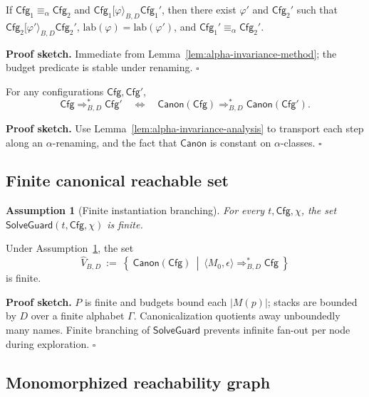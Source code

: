 \documentclass[runningheads]{llncs}
\newcommand{\Canon}{\mathsf{Canon}}
\newcommand{\Cfg}{\mathsf{Cfg}}
\newcommand{\SolveGuard}{\mathsf{SolveGuard}}
\newtheorem{assumption}{Assumption}
\begin{document}
\begin{lemma}
\label{lem:alpha-invariance-analysis}
If $\Cfg_1\equiv_\alpha \Cfg_2$ and $\Cfg_1[\varphi\rangle_{B,D}\Cfg_1'$,
then there exist $\varphi'$ and $\Cfg_2'$ such that
$\Cfg_2[\varphi'\rangle_{B,D}\Cfg_2'$, $\mathrm{lab}(\varphi)=\mathrm{lab}(\varphi')$,
and $\Cfg_1'\equiv_\alpha \Cfg_2'$.
\end{lemma}
\noindent\textbf{Proof sketch.}
Immediate from Lemma~\ref{lem:alpha-invariance-method}; the budget predicate is stable under renaming. \hfill $\square$

\begin{theorem}
\label{thm:quotient-soundness}
For any configurations $\Cfg,\Cfg'$,
\[
\Cfg \Rightarrow^{*}_{B,D} \Cfg'
\quad\Longleftrightarrow\quad
\Canon(\Cfg) \Rightarrow^{*}_{B,D} \Canon(\Cfg').
\]
\end{theorem}
\noindent\textbf{Proof sketch.}
Use Lemma~\ref{lem:alpha-invariance-analysis} to transport each step along an $\alpha$-renaming,
and the fact that $\Canon$ is constant on $\alpha$-classes. \hfill $\square$

\subsection{Finite canonical reachable set}
\label{sec:analysis:finiteness2}

\begin{assumption}[Finite instantiation branching]
\label{ass:finite-inst}
For every $t,\Cfg,\chi$, the set $\SolveGuard(t,\Cfg,\chi)$ is finite.
\end{assumption}

\begin{theorem}
\label{thm:finite-canon-reach}
Under Assumption~\ref{ass:finite-inst}, the set
\[
\widehat{V}_{B,D}
~:=~
\left\{\ \Canon(\Cfg)\ \middle|\ \langle M_0,\epsilon\rangle \Rightarrow^{*}_{B,D} \Cfg\ \right\}
\]
is finite.
\end{theorem}
\noindent\textbf{Proof sketch.}
$P$ is finite and budgets bound each $|M(p)|$; stacks are bounded by $D$ over a finite alphabet $\Gamma$.
Canonicalization quotients away unboundedly many names.
Finite branching of $\SolveGuard$ prevents infinite fan-out per node during exploration. \hfill $\square$

\subsection{Monomorphized reachability graph}
\label{sec:analysis:mrg}
\end{document}
